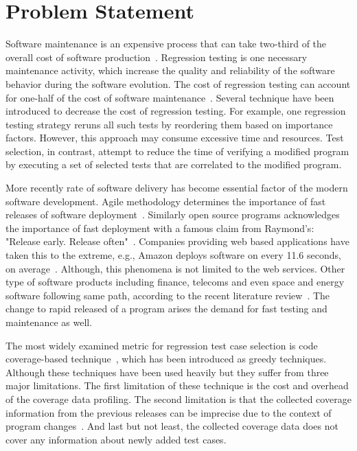 \section{Problem Statement}
\label{sec:motivation}



Software maintenance is an expensive process that can take two-third of 
the overall cost of software production~\cite{bibid}.  
Regression testing is one necessary maintenance activity, 
which increase the quality and reliability of the software 
behavior during the software evolution. 
The cost of regression testing can account for one-half of 
the cost of software maintenance~\cite{bibid}. 
Several technique have been introduced to decrease the
cost of regression testing. For example, one regression testing strategy 
reruns all such tests by reordering them based on importance factors.
However, this approach may consume excessive time and resources. 
Test selection, in contrast, attempt to reduce the time of verifying 
a modified program by executing a set of selected tests that are correlated
to the modified program. 


More recently rate of software delivery has become essential factor of the modern software development. 
Agile methodology determines the importance of fast releases of software deployment~\cite{bibid}. 
Similarly open source programs acknowledges the importance of fast deployment with a famous 
claim from Raymond's: "Release early. Release often"~\cite{bibid}. 
Companies providing web based applications have taken 
this to the extreme, e.g., Amazon deploys software on every 11.6 seconds, on average~\cite{bibid}. 
Although, this phenomena is not limited to the web services. 
Other type of software products including finance, telecoms and even space and energy 
software following same path, according to the recent literature review~\cite{22 hematti}. 
The change to rapid released of a program arises the demand for fast testing and maintenance as well. 


The most widely examined metric for regression test case selection
is code coverage-based technique~\cite{}, which has been introduced as greedy techniques.
Although these techniques have been used heavily but 
they suffer from three major limitations. The first limitation 
of these technique is the cost and overhead of the coverage data profiling. 
The second limitation is that the collected coverage information from the 
previous releases can be imprecise due to the context of program changes~\cite{sarfaraz}. 
And last but not least, the collected coverage data does not cover any information
about newly added test cases. 


